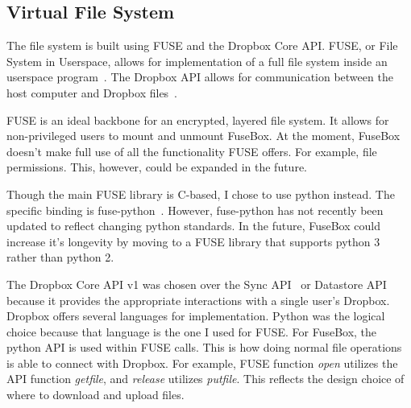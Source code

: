 \documentclass[11pt,twocolumn,letterpaper]{article}
\newcommand{\appname}{FuseBox }
\newcommand{\appnameWOspace}{FuseBox}
\begin{document}
\subsection{Virtual File System}
\label{sec:fsimp}
The file system is built using FUSE and the Dropbox Core
API. FUSE, or File System in Userspace, allows for implementation of a
full file system inside an userspace program~\cite{fuse}. The Dropbox
API allows for communication between the host computer and Dropbox
files~\cite{dropboxcore}.
\par FUSE is an ideal backbone for an encrypted, layered file system. It allows
for non-privileged users to mount and unmount \appnameWOspace. At the
moment, \appname doesn't make full use of all the functionality FUSE
offers. For example, file permissions. This, however, could be
expanded in the future. 
\par Though the main FUSE library is C-based, I chose to use python
instead. The specific binding is
fuse-python~\cite{fuse-python}. However, fuse-python has not recently
been updated to reflect changing python standards.
In the future, \appname could increase it's longevity by moving to a FUSE library
that supports python 3 rather than python 2.
\par The Dropbox Core API v1 was chosen over the Sync API~\cite{dropboxsync} or Datastore
API~\cite{dropboxdatastore} because it provides the appropriate interactions with a single
user's Dropbox. Dropbox offers several languages for
implementation. Python was the logical choice because that language is
the one I used for FUSE. For \appnameWOspace, the python API is used within FUSE
calls. This is how doing normal file operations is able to connect
with Dropbox. For example, FUSE function {\em open} utilizes the API
function {\em get\textunderscore file}, and {\em release} utilizes {\em
  put\textunderscore file}. This reflects
the design choice of where to download and upload files.
\end{document}
